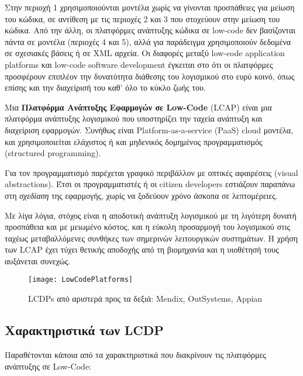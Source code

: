         \vspace{-2em}
        \begin{displayquote}
            \small Στην περιοχή 1 χρησιμοποιούνται μοντέλα χωρίς να γίνονται προσπάθειες για μείωση του κώδικα, σε αντίθεση με τις περιοχές 2 και 3 που στοχεύουν στην μείωση του κώδικα. Από την άλλη, οι πλατφόρμες ανάπτυξης κώδικα σε low-code δεν βασίζονται πάντα σε μοντέλα (περιοχές 4 και 5), αλλά για παράδειγμα χρησιμοποιούν δεδομένα σε σχεσιακές βάσεις ή σε XML αρχεία. Οι διαφορές μεταξύ low-code application platforms και low-code software development έγκειται στο ότι οι πλατφόρμες προσφέρουν επιπλέον την δυνατότητα διάθεσης του λογισμικού στο ευρύ κοινό, όπως επίσης και την διαχείρισή του καθ' όλο το κύκλο ζωής του.
        \end{displayquote}

        Μια \textbf{Πλατφόρμα Ανάπτυξης Εφαρμογών σε Low-Code} (LCAP) είναι μια πλατφόρμα ανάπτυξης λογισμικού που υποστηρίζει την ταχεία ανάπτυξη και διαχείριση εφαρμογών. Συνήθως είναι Platform-as-a-service (PaaS) cloud μοντέλα, και χρησιμοποιείται ελάχιστος ή και μηδενικός δομημένος προγραμματισμός (structured \linebreak programming).

        Για τον προγραμματισμό παρέχεται γραφικό περιβάλλον με οπτικές αφαιρέσεις (visual abstractions). Έτσι οι προγραμματιστές ή οι citizen developers εστιάζουν παραπάνω στη \textit{σχεδίαση} της εφαρμογής, χωρίς να ξοδεύουν χρόνο άσκοπα σε λεπτομέρειες.

        Με λίγα λόγια, στόχος είναι η αποδοτική ανάπτυξη λογισμικού με τη λιγότερη δυνατή προσπάθεια και με μειωμένο κόστος, και η εύκολη προσαρμογή του λογισμικού στις ταχέως μεταβαλλόμενες συνθήκες των σημερινών λειτουργικών συστημάτων. Η χρήση των LCAP έχει τύχει θετικής αποδοχής από τη βιομηχανία και η υιοθέτησή τους αυξάνεται συνεχώς. \cite{Bock2021,Bucaioni2022,Sahay2020}

        \begin{figure}[H] \noindent \centering
                \texttt{[image: LowCodePlatforms]}
                \caption{LCDPs από αριστερά προς τα δεξιά: Mendix, OutSystems, Appian \cite{LowCodeMendix}}
        \end{figure}

        \subsection{Χαρακτηριστικά των LCDP}
            Παραθέτονται κάποια από τα χαρακτηριστικά που διακρίνουν τις πλατφόρμες ανάπτυξης σε Low-Code:


